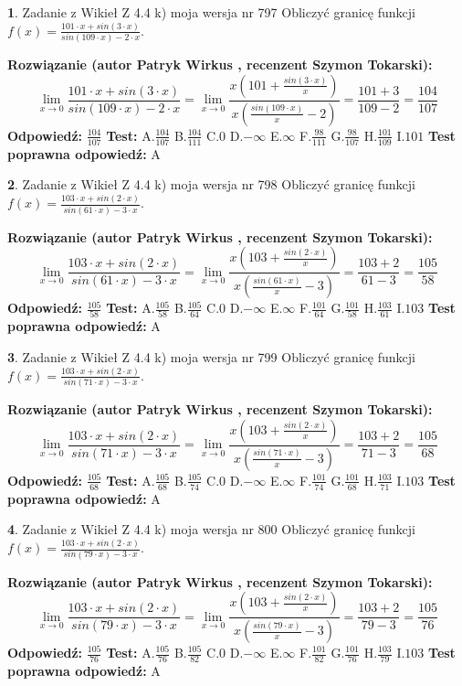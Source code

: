 \documentclass[12pt, a4paper]{article}
\theoremstyle{definition} %
\newtheorem{zad}{}
\newcommand{\zadStart}[1]{\begin{zad}#1\newline}
\newcommand{\zadStop}{\end{zad}}
\newcommand{\rozwStart}[2]{\noindent \textbf{Rozwiązanie (autor #1 , recenzent #2): }\newline}
\newcommand{\rozwStop}{\newline}
\newcommand{\odpStart}{\noindent \textbf{Odpowiedź:}\newline}
\newcommand{\odpStop}{\newline}
\newcommand{\testStart}{\noindent \textbf{Test:}\newline}
\newcommand{\testStop}{\newline}
\newcommand{\kluczStart}{\noindent \textbf{Test poprawna odpowiedź:}\newline}
\newcommand{\kluczStop}{\newline}
\begin{document}
\zadStart{Zadanie z Wikieł Z 4.4 k) moja wersja nr 797}
Obliczyć granicę funkcji $f(x)=\frac{101\cdot x +sin(3\cdot x)}{sin(109\cdot x) -2\cdot x}$.
\zadStop
\rozwStart{Patryk Wirkus}{Szymon Tokarski}
$$\lim\limits_{x\to 0}\frac{101\cdot x +sin(3\cdot x)}{sin(109\cdot x) -2\cdot x}
=\lim\limits_{x\to 0}\frac{x(101+\frac{sin(3\cdot x)}{x})}{x(\frac{sin(109\cdot x)}{x}-2)}
=\frac{101+3}{109-2} = \frac{104}{107}$$
\rozwStop
\odpStart
$\frac{104}{107}$
\odpStop
\testStart
A.$\frac{104}{107}$
B.$\frac{104}{111}$
C.$0$
D.$-\infty$
E.$\infty$
F.$\frac{98}{111}$
G.$\frac{98}{107}$
H.$\frac{101}{109}$
I.$101$
\testStop
\kluczStart
A
\kluczStop



\zadStart{Zadanie z Wikieł Z 4.4 k) moja wersja nr 798}
Obliczyć granicę funkcji $f(x)=\frac{103\cdot x +sin(2\cdot x)}{sin(61\cdot x) -3\cdot x}$.
\zadStop
\rozwStart{Patryk Wirkus}{Szymon Tokarski}
$$\lim\limits_{x\to 0}\frac{103\cdot x +sin(2\cdot x)}{sin(61\cdot x) -3\cdot x}
=\lim\limits_{x\to 0}\frac{x(103+\frac{sin(2\cdot x)}{x})}{x(\frac{sin(61\cdot x)}{x}-3)}
=\frac{103+2}{61-3} = \frac{105}{58}$$
\rozwStop
\odpStart
$\frac{105}{58}$
\odpStop
\testStart
A.$\frac{105}{58}$
B.$\frac{105}{64}$
C.$0$
D.$-\infty$
E.$\infty$
F.$\frac{101}{64}$
G.$\frac{101}{58}$
H.$\frac{103}{61}$
I.$103$
\testStop
\kluczStart
A
\kluczStop



\zadStart{Zadanie z Wikieł Z 4.4 k) moja wersja nr 799}
Obliczyć granicę funkcji $f(x)=\frac{103\cdot x +sin(2\cdot x)}{sin(71\cdot x) -3\cdot x}$.
\zadStop
\rozwStart{Patryk Wirkus}{Szymon Tokarski}
$$\lim\limits_{x\to 0}\frac{103\cdot x +sin(2\cdot x)}{sin(71\cdot x) -3\cdot x}
=\lim\limits_{x\to 0}\frac{x(103+\frac{sin(2\cdot x)}{x})}{x(\frac{sin(71\cdot x)}{x}-3)}
=\frac{103+2}{71-3} = \frac{105}{68}$$
\rozwStop
\odpStart
$\frac{105}{68}$
\odpStop
\testStart
A.$\frac{105}{68}$
B.$\frac{105}{74}$
C.$0$
D.$-\infty$
E.$\infty$
F.$\frac{101}{74}$
G.$\frac{101}{68}$
H.$\frac{103}{71}$
I.$103$
\testStop
\kluczStart
A
\kluczStop



\zadStart{Zadanie z Wikieł Z 4.4 k) moja wersja nr 800}
Obliczyć granicę funkcji $f(x)=\frac{103\cdot x +sin(2\cdot x)}{sin(79\cdot x) -3\cdot x}$.
\zadStop
\rozwStart{Patryk Wirkus}{Szymon Tokarski}
$$\lim\limits_{x\to 0}\frac{103\cdot x +sin(2\cdot x)}{sin(79\cdot x) -3\cdot x}
=\lim\limits_{x\to 0}\frac{x(103+\frac{sin(2\cdot x)}{x})}{x(\frac{sin(79\cdot x)}{x}-3)}
=\frac{103+2}{79-3} = \frac{105}{76}$$
\rozwStop
\odpStart
$\frac{105}{76}$
\odpStop
\testStart
A.$\frac{105}{76}$
B.$\frac{105}{82}$
C.$0$
D.$-\infty$
E.$\infty$
F.$\frac{101}{82}$
G.$\frac{101}{76}$
H.$\frac{103}{79}$
I.$103$
\testStop
\kluczStart
A
\kluczStop
\end{document}
